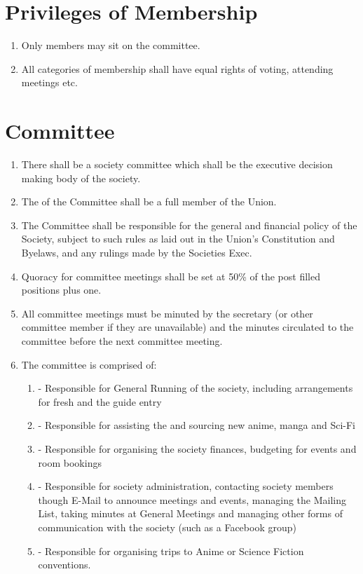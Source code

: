 \documentclass[a4paper,10pt]{article}
\begin{document}
\section{Privileges of Membership}
\begin{enumerate}
  \item Only members may sit on the committee.
  \item All categories of membership shall have equal rights of voting, attending meetings etc.
\end{enumerate}

\section{Committee}
\begin{enumerate}
  \item There shall be a society committee which shall be the executive decision making body of the society.
  \item The   of the Committee shall be a full member of the Union.
  \item The Committee shall be responsible for the general and financial policy of the Society, subject to such rules as laid out in the Union’s Constitution and Byelaws, and any rulings made by the Societies Exec.
  \item Quoracy for committee meetings shall be set at 50\% of the post filled positions plus one.
  \item All committee meetings must be minuted by the secretary (or other committee member if they are unavailable) and the minutes circulated to the committee before the next committee meeting.
  \item The committee is comprised of:
  \begin{enumerate}
    \item \textbf{ } - Responsible for General Running of the society, including arrangements for fresh and the guide entry
    \item \textbf{ } - Responsible for assisting the   and sourcing new anime, manga and Sci-Fi
    \item \textbf{ } - Responsible for organising the society finances, budgeting for events and room bookings
    \item \textbf{ } - Responsible for society administration, contacting society members though E-Mail to announce meetings and events, managing the Mailing List, taking minutes at General Meetings and managing other forms of communication with the society (such as a Facebook group)
    \item \textbf{ } - Responsible for organising trips to Anime or Science Fiction conventions.
  \end{enumerate}
\end{enumerate}
\end{document}
